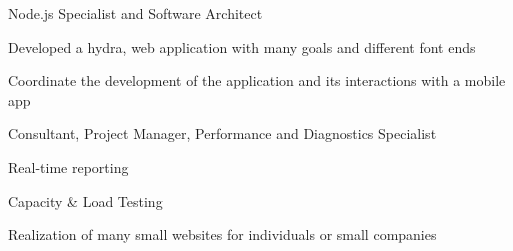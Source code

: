 \documentclass[letterpaper]{deedy-resume} %
\begin{document}
\begin{minipage}[t]{0.66\textwidth}
\sectionspace %


\begin{tightitemize}
\item Node.js Specialist and Software Architect
\item Developed a hydra, web application with many goals and different font ends
\item Coordinate the development of the application and its interactions with a mobile app
\end{tightitemize}

\sectionspace %


\begin{tightitemize}
\item Consultant, Project Manager, Performance and Diagnostics Specialist
\item Real-time reporting
\item Capacity \& Load Testing
\end{tightitemize}

\sectionspace %


\begin{tightitemize}
\item Realization of many small websites for individuals or small companies
\end{tightitemize}

\sectionspace %






\end{minipage}
\end{document}
